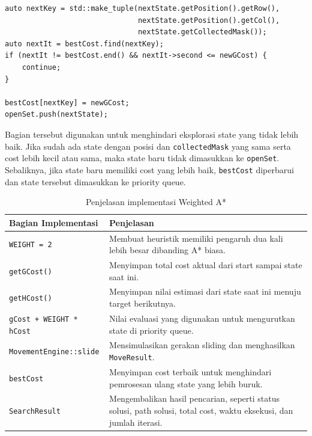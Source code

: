 \begin{tcolorbox}[
	colback=purple!5,
	colframe=purple!60!black,
	title=\textbf{Potongan Source Code Asli: Pruning State Weighted A*},
	arc=2mm,
	boxrule=0.8pt
]
\small
\begin{verbatim}
auto nextKey = std::make_tuple(nextState.getPosition().getRow(),
                               nextState.getPosition().getCol(),
                               nextState.getCollectedMask());
auto nextIt = bestCost.find(nextKey);
if (nextIt != bestCost.end() && nextIt->second <= newGCost) {
    continue;
}

bestCost[nextKey] = newGCost;
openSet.push(nextState);
\end{verbatim}
\end{tcolorbox}

Bagian tersebut digunakan untuk menghindari eksplorasi state yang tidak lebih baik. 
Jika sudah ada state dengan posisi dan \texttt{collectedMask} yang sama serta cost lebih kecil atau sama, maka state baru tidak dimasukkan ke \texttt{openSet}. 
Sebaliknya, jika state baru memiliki cost yang lebih baik, \texttt{bestCost} diperbarui dan state tersebut dimasukkan ke priority queue.

\begin{table}[H]
	\centering
	\caption{Penjelasan implementasi Weighted A*}
	\begin{tabular}{|p{4cm}|p{10cm}|}
		\hline
		\rowcolor{purple!15}
		\textbf{Bagian Implementasi} & \textbf{Penjelasan} \\
		\hline
		\texttt{WEIGHT = 2} & Membuat heuristik memiliki pengaruh dua kali lebih besar dibanding A* biasa. \\
		\hline
		\texttt{getGCost()} & Menyimpan total cost aktual dari start sampai state saat ini. \\
		\hline
		\texttt{getHCost()} & Menyimpan nilai estimasi dari state saat ini menuju target berikutnya. \\
		\hline
		\texttt{gCost + WEIGHT * hCost} & Nilai evaluasi yang digunakan untuk mengurutkan state di priority queue. \\
		\hline
		\texttt{MovementEngine::slide} & Mensimulasikan gerakan sliding dan menghasilkan \texttt{MoveResult}. \\
		\hline
		\texttt{bestCost} & Menyimpan cost terbaik untuk menghindari pemrosesan ulang state yang lebih buruk. \\
		\hline
		\texttt{SearchResult} & Mengembalikan hasil pencarian, seperti status solusi, path solusi, total cost, waktu eksekusi, dan jumlah iterasi. \\
		\hline
	\end{tabular}
\end{table}

